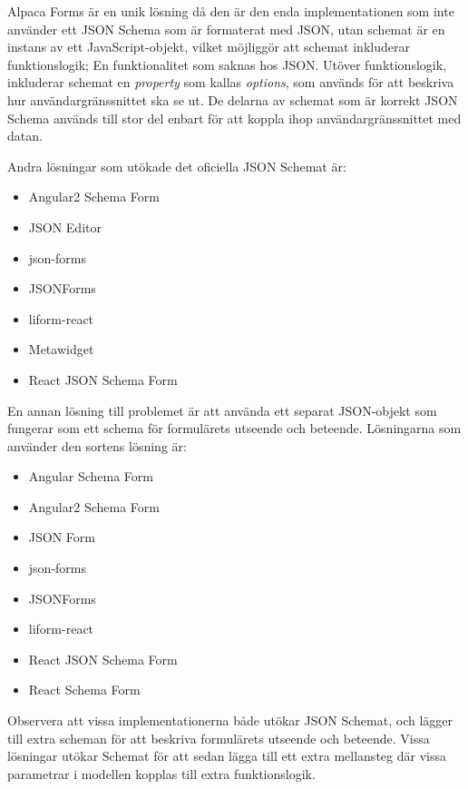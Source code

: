 Alpaca Forms är en unik lösning då den är den enda implementationen som inte använder ett JSON Schema som är formaterat med JSON, utan schemat är en instans av ett JavaScript-objekt, vilket möjliggör att schemat inkluderar funktionslogik; En funktionalitet som saknas hos JSON. Utöver funktionslogik, inkluderar schemat en \textit{property} som kallas \textit{options}, som används för att beskriva hur användargränssnittet ska se ut. De delarna av schemat som är korrekt JSON Schema används till stor del enbart för att koppla ihop användargränssnittet med datan. \cite{GitanaSoftwareInc.}

Andra lösningar som utökade det oficiella JSON Schemat är:
\begin{itemize}
	\item Angular2 Schema Form \cite{MakinaCorpus}
	\item JSON Editor \cite{JeremyDorn}
	\item json-forms \cite{Brutusin.org}
	\item JSONForms \cite{EclipseSource}
	\item liform-react \cite{NachoMartin}
	\item Metawidget \cite{Metawidget}
	\item React JSON Schema Form \cite{MozillaServices}
\end{itemize}

En annan lösning till problemet är att använda ett separat JSON-objekt som fungerar som ett schema för formulärets utseende och beteende. Lösningarna som använder den sortens lösning är:
\begin{itemize}
	\item Angular Schema Form \cite{Textalk}
	\item Angular2 Schema Form \cite{MakinaCorpus}
	\item JSON Form \cite{Joshfire}
	\item json-forms \cite{Brutusin.org}
	\item JSONForms \cite{EclipseSource}
	\item liform-react \cite{NachoMartin}
	\item React JSON Schema Form \cite{MozillaServices}
	\item React Schema Form \cite{NetworkNewTechnologiesInc.}
\end{itemize}

Observera att vissa implementationerna både utökar JSON Schemat, och lägger till extra scheman för att beskriva formulärets utseende och beteende. Vissa lösningar utökar Schemat för att sedan lägga till ett extra mellansteg där vissa parametrar i modellen kopplas till extra funktionslogik.